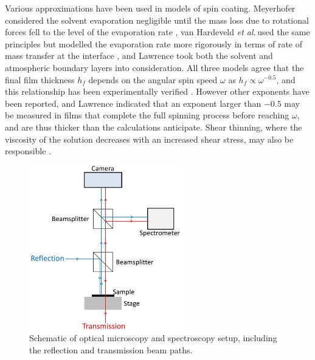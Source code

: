 Various approximations have been used in models of spin coating. Meyerhofer considered the solvent evaporation negligible until the mass loss due to rotational forces fell to the level of the evaporation rate \cite{Meyerhofer1978}, van Hardeveld \textit{et al.\,}used the same principles but modelled the evaporation rate more rigorously in terms of rate of mass transfer at the interface \cite{VanHardeveld1995}, and Lawrence took both the solvent and atmospheric boundary layers into consideration\cite{Lawrence1988}. All three models agree that the final film thickness $h_f$ depends on the angular spin speed $\omega$ as $h_f \propto \omega^{-0.5}$, and this relationship has been experimentally verified \cite{Meyerhofer1978, VanHardeveld1995}. However other exponents have been reported, and Lawrence indicated that an exponent %
larger %
than $-0.5$ may be measured in films that complete the full spinning process before reaching $\omega$, and are thus thicker than the calculations anticipate. Shear thinning, where the viscosity of the solution decreases with an increased shear stress, may also be responsible \cite{Lawrence1988}.

\begin{figure}[h!]
\centering    
\includegraphics[width=0.6\textwidth]{Microscope}
\caption{Schematic of optical microscopy and spectroscopy setup, including the reflection and transmission beam paths.}
\label{Microscope}
\end{figure}

